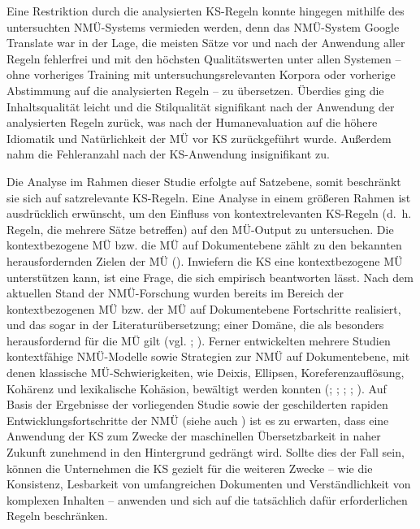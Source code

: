 Eine Restriktion durch die analysierten KS-Regeln konnte hingegen mithilfe des untersuchten NMÜ-Systems vermieden werden, denn das NMÜ-System Google Translate war in der Lage, die meisten Sätze vor und nach der Anwendung aller Regeln fehlerfrei und mit den höchsten Qualitätswerten unter allen Systemen -- ohne vorheriges Training mit untersuchungsrelevanten Korpora oder vorherige Abstimmung auf die analysierten Regeln -- zu übersetzen. Überdies ging die Inhaltsqualität leicht und die Stilqualität signifikant nach der Anwendung der analysierten Regeln zurück, was nach der Humanevaluation auf die höhere Idiomatik und Natürlichkeit der MÜ vor KS zurückgeführt wurde. Außerdem nahm die Fehleranzahl nach der KS-Anwendung insignifikant zu.

Die Analyse im Rahmen dieser Studie erfolgte auf Satzebene, somit beschränkt sie sich auf satzrelevante KS-Regeln. Eine Analyse in einem größeren Rahmen ist ausdrücklich erwünscht, um den Einfluss von kontextrelevanten KS-Regeln (d.~h. Regeln, die mehrere Sätze betreffen) auf den MÜ-Output zu untersuchen. Die kontextbezogene MÜ bzw. die MÜ auf Dokumentebene zählt zu den bekannten herausfordernden Zielen der MÜ (\citealt{ZhangZong2020}). Inwiefern die KS eine kontextbezogene MÜ unterstützen kann, ist eine Frage, die sich empirisch beantworten lässt. Nach dem aktuellen Stand der NMÜ-Forschung wurden bereits im Bereich der kontextbezogenen MÜ bzw. der MÜ auf Dokumentebene Fortschritte realisiert, und das sogar in der Literaturübersetzung; einer Domäne, die als besonders herausfordernd für die MÜ gilt (vgl. \citealt{ToralWay2018}; \citealt{Matusov2019}). Ferner entwickelten mehrere Studien kontextfähige NMÜ-Modelle sowie Strategien zur NMÜ auf Dokumentebene, mit denen klassische MÜ-Schwierigkeiten, wie Deixis, Ellipsen, Koreferenzauflösung, Kohärenz und lexikalische Kohäsion, bewältigt werden konnten (\citealt{MüllerEtAl2018}; \citealt{StojanovskiFraser2018}; \citealt{VoitaEtAl2018}; \citealt{StojanovskiFraser2019}; \citealt{VoitaEtAl2019}). Auf Basis der Ergebnisse der vorliegenden Studie sowie der geschilderten rapiden Entwicklungsfortschritte der NMÜ (siehe auch ) ist es zu erwarten, dass eine Anwendung der KS zum Zwecke der maschinellen Übersetzbarkeit in naher Zukunft zunehmend in den Hintergrund gedrängt wird. Sollte dies der Fall sein, können die Unternehmen die KS gezielt für die weiteren Zwecke -- wie die Konsistenz, Lesbarkeit von umfangreichen Dokumenten und Verständlichkeit von komplexen Inhalten -- anwenden und sich auf die tatsächlich dafür erforderlichen Regeln beschränken.

